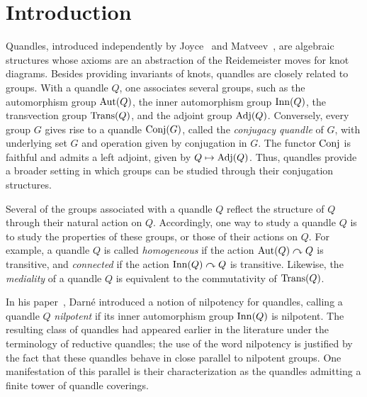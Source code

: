 \section{Introduction}
\label{section: introduction}


Quandles, introduced independently by Joyce~\cite{joyce_1982_a_classifying_invariant_of_knots_the_knot_quandle} and Matveev~\cite{matveev_1982_distributive_groupoids_in_knot_theory}, are algebraic structures whose axioms are an abstraction of the Reidemeister moves for knot diagrams.
Besides providing invariants of knots, quandles are closely related to groups.
With a quandle $Q$, one associates several groups, such as the automorphism group $\operatorname{Aut}(Q)$, the inner automorphism group $\operatorname{Inn}(Q)$, the transvection group $\operatorname{Trans}(Q)$, and the adjoint group $\operatorname{Adj}(Q)$.
Conversely, every group $G$ gives rise to a quandle $\operatorname{Conj}(G)$, called the \emph{conjugacy quandle} of $G$, with underlying set $G$ and operation given by conjugation in $G$.
The functor $\operatorname{Conj}$ is faithful and admits a left adjoint, given by $Q\mapsto \operatorname{Adj}(Q)$.
Thus, quandles provide a broader setting in which groups can be studied through their conjugation structures.

Several of the groups associated with a quandle $Q$ reflect the structure of $Q$ through their natural action on $Q$. Accordingly, one way to study a quandle $Q$ is to study the properties of these groups, or those of their actions on $Q$. For example, a quandle $Q$ is called \emph{homogeneous} if the action $\operatorname{Aut}(Q)\curvearrowright Q$ is transitive, and \emph{connected} if the action $\operatorname{Inn}(Q)\curvearrowright Q$ is transitive. 
Likewise, the \emph{mediality} of a quandle $Q$ is equivalent to the commutativity of $\operatorname{Trans}(Q)$.


In his paper~\cite{darne_2026_nilpotent_quandles}, Darn\'e introduced a notion of nilpotency for quandles, calling a quandle $Q$ \emph{nilpotent} if its inner automorphism group $\operatorname{Inn}(Q)$ is nilpotent.
The resulting class of quandles had appeared earlier in the literature under the terminology of reductive quandles; the use of the word nilpotency is justified by the fact that these quandles behave in close parallel to nilpotent groups.
One manifestation of this parallel is their characterization as the quandles admitting a finite tower of quandle coverings.


